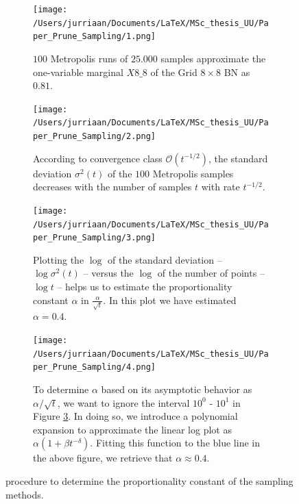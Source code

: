 \documentclass[a4paper, twoside, 11pt]{report}
\theoremstyle{plain}
\theoremstyle{definition}
\theoremstyle{remark}
\begin{document}
\begin{figure}[H]
\centering
\begin{subfigure}[t]{0.5\textwidth}
  \centering
  \captionsetup{width = 0.9\textwidth}
  \texttt{[image: /Users/jurriaan/Documents/LaTeX/MSc\_thesis\_UU/Paper\_Prune\_Sampling/1.png]}
  \caption{$100$ Metropolis runs of $25.000$ samples approximate the one-variable marginal $X 8\_8$ of the Grid $8 \times 8$ BN as $0.81$.}
  \label{sub_a}
\end{subfigure}%
\begin{subfigure}[t]{0.5\textwidth}
  \centering
  \captionsetup{width = 0.9\textwidth}
  \texttt{[image: /Users/jurriaan/Documents/LaTeX/MSc\_thesis\_UU/Paper\_Prune\_Sampling/2.png]}
  \caption{According to convergence class $\mathcal{O}(t^{-1/2})$, the standard deviation ${\sigma}^2(t)$ of the $100$ Metropolis samples decreases with the number of samples $t$ with rate $t^{-1/2}$.}
  \label{sub_b}
\end{subfigure}

\begin{subfigure}[t]{0.5\textwidth}
  \centering
  \captionsetup{width = 0.9\textwidth}
  \texttt{[image: /Users/jurriaan/Documents/LaTeX/MSc\_thesis\_UU/Paper\_Prune\_Sampling/3.png]}
  \caption{Plotting the $\log$ of the standard deviation -- $\log {\sigma}^2(t)$ -- versus the $\log$ of the number of points -- $\log t$ -- helps us to estimate the proportionality constant $\alpha$ in $\frac{\alpha}{\sqrt{t}}$. In this plot we have estimated $\alpha = 0.4$.}
  \label{sub_c}
\end{subfigure}%
\begin{subfigure}[t]{0.5\textwidth}
  \centering
  \captionsetup{width = 0.9\textwidth}
  \texttt{[image: /Users/jurriaan/Documents/LaTeX/MSc\_thesis\_UU/Paper\_Prune\_Sampling/4.png]}
  \caption{To determine $\alpha$ based on its asymptotic behavior as $\alpha / \sqrt{t}$, we want to ignore the interval $10^0$ - $10^1$ in Figure \ref{sub_c}. In doing so, we introduce a polynomial expansion to approximate the linear log plot as $\alpha(1+\beta t^{-\delta})$. Fitting this function to the blue line in the above figure, we retrieve that $\alpha \approx 0.4$. }
  \label{sub_d}
\end{subfigure}
\caption{procedure to determine the proportionality constant of the sampling methods.}
\label{determine-c}
\end{figure}
\end{document}
